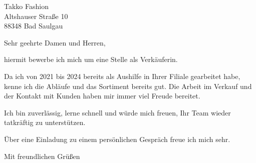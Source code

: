 \documentclass[11pt,a4paper]{scrlttr2}
\begin{document}
\begin{letter}{
    Takko Fashion \\
    Altshauser Straße 10\\
    88348 Bad Saulgau
}


\opening{Sehr geehrte Damen und Herren,}

hiermit bewerbe ich mich um eine Stelle als Verkäuferin.

Da ich von 2021 bis 2024 bereits als Aushilfe in Ihrer Filiale gearbeitet habe, kenne ich die Abläufe und das Sortiment bereits gut. Die Arbeit im Verkauf und der Kontakt mit Kunden haben mir immer viel Freude bereitet.

Ich bin zuverlässig, lerne schnell und würde mich freuen, Ihr Team wieder tatkräftig zu unterstützen.

Über eine Einladung zu einem persönlichen Gespräch freue ich mich sehr.

\closing{Mit freundlichen Grüßen}

\end{letter}
\end{document}
